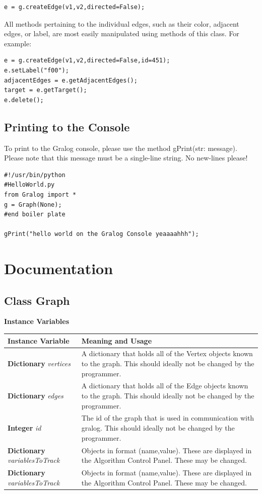 \documentclass{article}
\newcounter{example}
\newlength\q
\begin{document}
\begin{lstlisting}
e = g.createEdge(v1,v2,directed=False);
\end{lstlisting}

All methods pertaining to the individual edges, such as their color, adjacent edges, or label, are most easily manipulated using methods of this class. For example:

\begin{lstlisting}
e = g.createEdge(v1,v2,directed=False,id=451);
e.setLabel("f00");
adjacentEdges = e.getAdjacentEdges();
target = e.getTarget();
e.delete();
\end{lstlisting}

\subsection{Printing to the Console}
To print to the Gralog console, please use the method gPrint(str: message). Please note that this message must be a single-line string. No new-lines please!

\begin{lstlisting}
#!/usr/bin/python
#HelloWorld.py
from Gralog import *
g = Graph(None);
#end boiler plate

gPrint("hello world on the Gralog Console yeaaaahhh");
\end{lstlisting}

\section{Documentation}

\subsection{Class Graph}

\textbf{{\large Instance Variables}}


\begin{longtable}{p{\q}p{\q}}
Instance Variable & Meaning and Usage \\ \hline
\textbf{Dictionary} \textit{vertices} & A dictionary that holds all of the Vertex objects known to the graph. This should ideally not be changed by the programmer. \\\hline
\textbf{Dictionary} \textit{edges} & A dictionary that holds all of the Edge objects known to the graph. This should ideally not be changed by the programmer. \\\hline
\textbf{Integer} \textit{id} & The id of the graph that is used in communication with gralog. This should ideally not be changed by the programmer. \\ \hline
\textbf{Dictionary} \textit{variablesToTrack} & Objects in format (name,value). These are displayed in the Algorithm Control Panel. These may be changed. \\ \hline
\textbf{Dictionary} \textit{variablesToTrack} & Objects in format (name,value). These are displayed in the Algorithm Control Panel. These may be changed. \\ \hline
\end{longtable}
\end{document}
